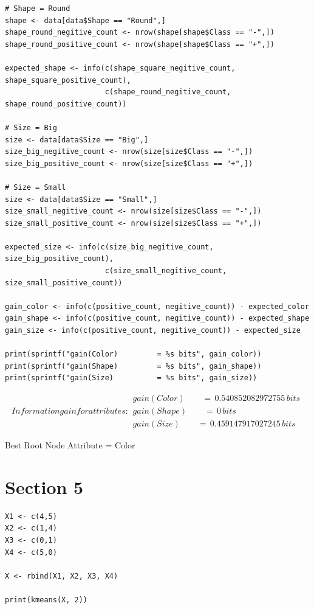 \documentclass{report}
\begin{document}
\begin{verbatim}
# Shape = Round
shape <- data[data$Shape == "Round",]
shape_round_negitive_count <- nrow(shape[shape$Class == "-",])
shape_round_positive_count <- nrow(shape[shape$Class == "+",])

expected_shape <- info(c(shape_square_negitive_count, shape_square_positive_count),
                       c(shape_round_negitive_count, shape_round_positive_count))

# Size = Big
size <- data[data$Size == "Big",]
size_big_negitive_count <- nrow(size[size$Class == "-",])
size_big_positive_count <- nrow(size[size$Class == "+",])

# Size = Small
size <- data[data$Size == "Small",]
size_small_negitive_count <- nrow(size[size$Class == "-",])
size_small_positive_count <- nrow(size[size$Class == "+",])

expected_size <- info(c(size_big_negitive_count, size_big_positive_count),
                       c(size_small_negitive_count, size_small_positive_count))

gain_color <- info(c(positive_count, negitive_count)) - expected_color
gain_shape <- info(c(positive_count, negitive_count)) - expected_shape
gain_size <- info(c(positive_count, negitive_count)) - expected_size

print(sprintf("gain(Color)         = %s bits", gain_color))
print(sprintf("gain(Shape)         = %s bits", gain_shape))
print(sprintf("gain(Size)          = %s bits", gain_size))

\end{verbatim}


\begin{subequations}
  Information gain for attributes:
  \begin{flalign*}
    gain(Color)\qquad    =\, 0.540852082972755\, bits \\
    gain(Shape)\qquad    =\, 0\, bits \qquad \qquad \qquad \quad\ \ \, \\
    gain(Size)\qquad     =\, 0.459147917027245\, bits
  \end{flalign*}
\end{subequations}

Best Root Node Attribute = Color

\chapter{Section 5}

\begin{verbatim}
X1 <- c(4,5)
X2 <- c(1,4)
X3 <- c(0,1)
X4 <- c(5,0)

X <- rbind(X1, X2, X3, X4)

print(kmeans(X, 2))
\end{verbatim}
\end{document}
